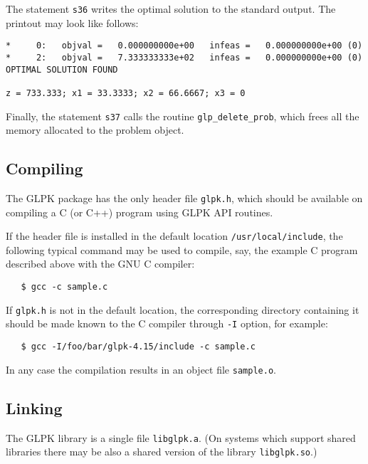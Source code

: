 The statement \verb|s36| writes the optimal solution to the standard
output. The printout may look like follows:

\newpage

\begin{footnotesize}
\begin{verbatim}
*     0:   objval =   0.000000000e+00   infeas =   0.000000000e+00 (0)
*     2:   objval =   7.333333333e+02   infeas =   0.000000000e+00 (0)
OPTIMAL SOLUTION FOUND

z = 733.333; x1 = 33.3333; x2 = 66.6667; x3 = 0
\end{verbatim}
\end{footnotesize}

Finally, the statement \verb|s37| calls the routine
\verb|glp_delete_prob|, which frees all the memory allocated to the
problem object.

\subsection{Compiling}

The GLPK package has the only header file \verb|glpk.h|, which should
be available on compiling a C (or C++) program using GLPK API routines.

If the header file is installed in the default location
\verb|/usr/local/include|, the following typical command may be used to
compile, say, the example C program described above with the GNU C
compiler:

\begin{verbatim}
   $ gcc -c sample.c
\end{verbatim}

If \verb|glpk.h| is not in the default location, the corresponding
directory containing it should be made known to the C compiler through
\verb|-I| option, for example:

\begin{verbatim}
   $ gcc -I/foo/bar/glpk-4.15/include -c sample.c
\end{verbatim}

In any case the compilation results in an object file \verb|sample.o|.

\subsection{Linking}

The GLPK library is a single file \verb|libglpk.a|. (On systems which
support shared libraries there may be also a shared version of the
library \verb|libglpk.so|.)

